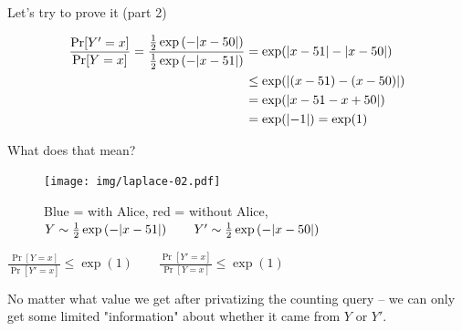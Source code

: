 \documentclass[12pt,aspectratio=169,handout]{beamer}
\begin{document}
\begin{frame}{Let's try to prove it (part 2)}


$$
\begin{aligned}
\frac{\Pr[Y' = x]}{\Pr[Y = x]} =
\frac{
	\frac{1}{2} \exp \left( - \abs{x - 50} \right)
}{
	\frac{1}{2} \exp \left( - \abs{x - 51} \right) 
}
&= \exp ( \abs{x - 51} - \abs{x - 50} ) \\
&\leq \exp ( \abs{(x - 51) - (x - 50)} ) \\
&= \exp ( \abs{x - 51 - x + 50} ) \\
&= \exp (\abs{-1}) = \exp(1)
\end{aligned}
$$



\end{frame}


\begin{frame}{What does that mean?}
\begin{figure}
\centering
\texttt{[image: img/laplace-02.pdf]}
\caption{Blue = with Alice, red = without Alice, $Y \sim  \frac{1}{2} \exp \left(- \abs{x - 51} \right) \qquad
Y' \sim \frac{1}{2} \exp \left(- \abs{x - 50} \right)$}
\end{figure}

$
\frac{\Pr[Y = x]}{\Pr[Y' = x]} \leq \exp(1) \qquad
\frac{\Pr[Y' = x]}{\Pr[Y = x]} \leq \exp(1)
$


No matter what value we get after privatizing the counting query -- we can only get some limited "information" about whether it came from $Y$ or $Y'$.



\end{frame}
\end{document}
